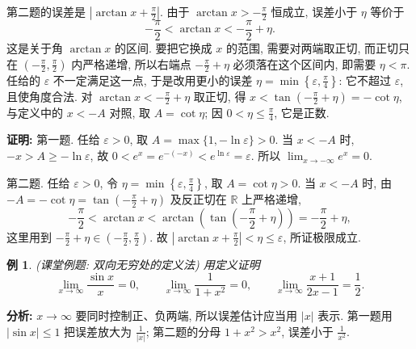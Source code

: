 \documentclass[UTF8,openany]{ctexbook}
\theoremstyle{chinesetextbook}
\newtheorem{example}{例}[section]
\newenvironment{cnproof}{\par\indent\textbf{证明:} \ignorespaces}{\par}
\begin{document}
第二题的误差是 $\displaystyle\left|\arctan x+\frac\pi2\right|$. 由于 $\displaystyle\arctan x>-\frac\pi2$ 恒成立, 误差小于 $\eta$ 等价于
\[
-\frac\pi2<\arctan x<-\frac\pi2+\eta.
\]
这是关于角 $\arctan x$ 的区间. 要把它换成 $x$ 的范围, 需要对两端取正切, 而正切只在 $\displaystyle\left(-\frac\pi2,\frac\pi2\right)$ 内严格递增, 所以右端点 $\displaystyle-\frac\pi2+\eta$ 必须落在这个区间内, 即需要 $\eta<\pi$. 任给的 $\varepsilon$ 不一定满足这一点, 于是改用更小的误差 $\displaystyle\eta=\min\left\{\varepsilon,\frac\pi4\right\}$: 它不超过 $\varepsilon$, 且使角度合法. 对 $\displaystyle\arctan x<-\frac\pi2+\eta$ 取正切, 得 $\displaystyle x<\tan\left(-\frac\pi2+\eta\right)=-\cot\eta$, 与定义中的 $x<-A$ 对照, 取 $A=\cot\eta$; 因 $\displaystyle0<\eta\le\frac\pi4$, 它是正数.
\begin{cnproof}
第一题. 任给 $\varepsilon>0$, 取 $A=\max\{1,-\ln\varepsilon\}>0$. 当 $x<-A$ 时, $-x>A\ge-\ln\varepsilon$, 故 $0<e^x=e^{-(-x)}<e^{\ln\varepsilon}=\varepsilon$. 所以 $\displaystyle\lim_{x\to-\infty}e^x=0$.

第二题. 任给 $\varepsilon>0$, 令 $\displaystyle\eta=\min\left\{\varepsilon,\frac\pi4\right\}$, 取 $A=\cot\eta>0$. 当 $x<-A$ 时, 由 $\displaystyle-A=-\cot\eta=\tan\left(-\frac\pi2+\eta\right)$ 及反正切在 $\mathbb R$ 上严格递增,
\[
-\frac\pi2<\arctan x<\arctan\left(\tan\left(-\frac\pi2+\eta\right)\right)=-\frac\pi2+\eta,
\]
这里用到 $\displaystyle-\frac\pi2+\eta\in\left(-\frac\pi2,\frac\pi2\right)$. 故 $\displaystyle\left|\arctan x+\frac\pi2\right|<\eta\le\varepsilon$, 所证极限成立.
\end{cnproof}
\begin{example}
\textnormal{(课堂例题: 双向无穷处的定义法)} 用定义证明
\[
\lim_{x\to\infty}\frac{\sin x}{x}=0,\qquad
\lim_{x\to\infty}\frac1{1+x^2}=0,\qquad
\lim_{x\to\infty}\frac{x+1}{2x-1}=\frac12.
\]
\end{example}
\par\indent\textbf{分析:} $x\to\infty$ 要同时控制正、负两端, 所以误差估计应当用 $|x|$ 表示. 第一题用 $|\sin x|\le1$ 把误差放大为 $\displaystyle\frac1{|x|}$; 第二题的分母 $1+x^2>x^2$, 误差小于 $\displaystyle\frac1{x^2}$.
\end{document}
